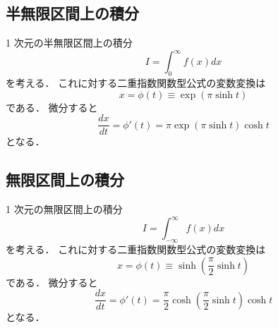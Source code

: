 \subsection{半無限区間上の積分}

1 次元の半無限区間上の積分
\begin{equation}
    I = \int_{0}^{\infty} f(x) dx
\end{equation}
を考える．
これに対する二重指数関数型公式の変数変換は
\begin{equation}
    x = \phi(t) \equiv \exp(\pi \sinh{t})
\end{equation}
である\cite[Section 4.5.3]{Press2007}．
微分すると
\begin{equation}
    \frac{dx}{dt} = \phi'(t)
    = \pi \exp(\pi \sinh{t}) \cosh{t}
\end{equation}
となる．

\subsection{無限区間上の積分}

1 次元の無限区間上の積分
\begin{equation}
    I = \int_{-\infty}^{\infty} f(x) dx
\end{equation}
を考える．
これに対する二重指数関数型公式の変数変換は
\begin{equation}
    x = \phi(t) \equiv \sinh \left(\frac{\pi}{2} \sinh{t}\right)
\end{equation}
である\cite[Section 4.5.3]{Press2007}．
微分すると
\begin{equation}
    \frac{dx}{dt} = \phi'(t)
    = \frac{\pi}{2} \cosh \left(\frac{\pi}{2} \sinh{t}\right) \cosh{t}
\end{equation}
となる．
